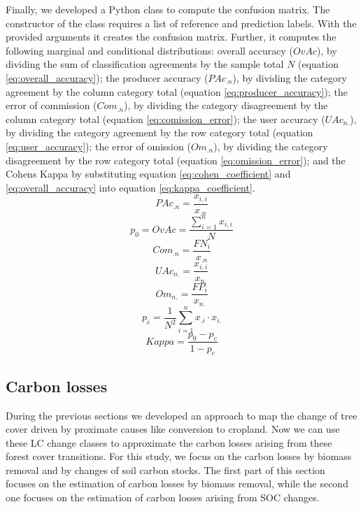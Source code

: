 			Finally, we developed a Python class to compute the confusion matrix. The constructor of the class requires a list of reference and prediction labels. With the provided arguments it creates the confusion matrix. Further, it computes the following marginal and conditional distributions: overall accuracy ($OvAc$), by dividing the sum of classification agreements by the sample total $N$ (equation \ref{eq:overall_accuracy}); the producer accuracy ($PAc_{.n}$), by dividing the category agreement by the column category total (equation \ref{eq:producer_accuracy}); the error of commission ($Com_{.n}$), by dividing the category disagreement by the column category total (equation \ref{eq:comission_error}); the user accuracy ($UAc_{n.}$), by dividing the category agreement by the row category total (equation \ref{eq:user_accuracy}); the error of omission ($Om_{.n}$), by dividing the category disagreement by the row category total (equation \ref{eq:omission_error}); and the Cohens Kappa by substituting equation \ref{eq:cohen_coefficient} and \ref{eq:overall_accuracy} into equation \ref{eq:kappa_coefficient}.
			\begin{equation}
			\label{eq:producer_accuracy}
				PAc_{.n} = \frac{x_{i,i}}{x_{.n}}
			\end{equation}
			\begin{equation}
			\label{eq:overall_accuracy}
				p_0=OvAc = \frac{\displaystyle\sum_{i=1}^{n}x_{i,i}}{N}
			\end{equation}
			\begin{equation}
			\label{eq:comission_error}
				Com_{.n} = \frac{FN_i}{x_{.n}}
			\end{equation}
			\begin{equation}
			\label{eq:user_accuracy}
				UAc_{n.} = \frac{x_{i,i}}{x_{n.}}
			\end{equation}
			\begin{equation}
			\label{eq:omission_error}
				Om_{n.} = \frac{FP_i}{x_{n.}}
			\end{equation}
			\begin{equation}
			\label{eq:cohen_coefficient}
				p_c = \frac{1}{N^2}\displaystyle\sum_{i=1}^{n} x_{.i} \cdot x_{i.}
			\end{equation}
			\begin{equation}
			\label{eq:kappa_coefficient}
				Kappa = \frac{p_0-p_c}{1-p_c}
			\end{equation}

	\subsection{Carbon losses}
		During the previous sections we developed an approach to map the change of tree cover driven by proximate causes like conversion to cropland. Now we can use these \ac{LC} change classes to approximate the carbon losses arising from these forest cover transitions. For this study, we focus on the carbon losses by biomass removal and by changes of soil carbon stocks. The first part of this section focuses on the estimation of carbon losses by biomass removal, while the second one focuses on the estimation of carbon losses arising from \ac{SOC} changes. 

